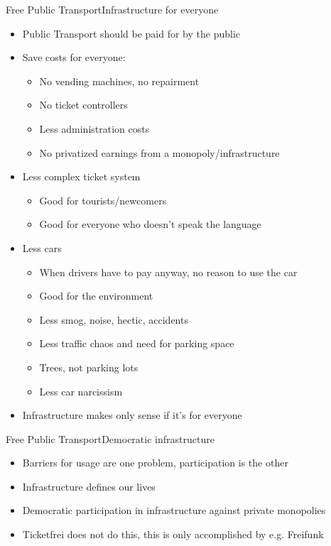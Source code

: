 \documentclass[10pt]{beamer}
\begin{document}
{\begin{frame}{Free Public Transport}{Infrastructure for everyone}
  \begin{itemize}
    \item<1-> Public Transport should be paid for by the public
    \item<1-> Save costs for everyone:
    \begin{itemize}
    	\item<1-> No vending machines, no repairment
    	\item<1-> No ticket controllers
    	\item<1-> Less administration costs
    	\item<1-> No privatized earnings from a monopoly/infrastructure
    \end{itemize}
    \item<2-> Less complex ticket system
    \begin{itemize}
    	\item<1-> Good for tourists/newcomers
    	\item<1-> Good for everyone who doesn't speak the language
    \end{itemize}
    \item<3-> Less cars
    \begin{itemize}
    	\item<1-> When drivers have to pay anyway, no reason to use the car
    	\item<1-> Good for the environment
    	\item<1-> Less smog, noise, hectic, accidents
    	\item<1-> Less traffic chaos and need for parking space
    	\item<1-> Trees, not parking lots
    	\item<1-> Less car narcissism
    \end{itemize}
  	\item<4-> Infrastructure makes only sense if it's for everyone
  \end{itemize}
\end{frame}

\begin{frame}{Free Public Transport}{Democratic infrastructure}

\begin{itemize}
    \item<1-> Barriers for usage are one problem, participation is the other
    \item<1-> Infrastructure defines our lives
    \item<1-> Democratic participation in infrastructure against private monopolies
	\item<1-> Ticketfrei does not do this, this is only accomplished by e.g. Freifunk
\end{itemize}
    


\end{frame}}
\end{document}
